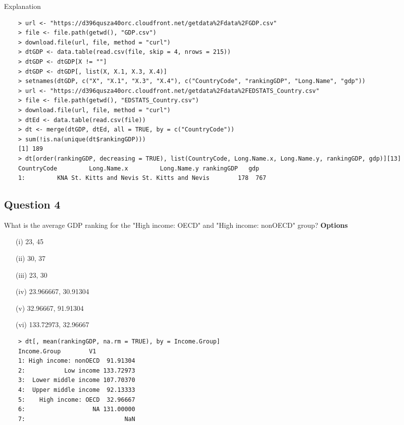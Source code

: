 \documentclass[]{article}
\begin{document}
Explanation
\begin{framed}
	\begin{verbatim}
	> url <- "https://d396qusza40orc.cloudfront.net/getdata%2Fdata%2FGDP.csv"
	> file <- file.path(getwd(), "GDP.csv")
	> download.file(url, file, method = "curl")
	> dtGDP <- data.table(read.csv(file, skip = 4, nrows = 215))
	> dtGDP <- dtGDP[X != ""]
	> dtGDP <- dtGDP[, list(X, X.1, X.3, X.4)]
	> setnames(dtGDP, c("X", "X.1", "X.3", "X.4"), c("CountryCode", "rankingGDP", "Long.Name", "gdp"))
	> url <- "https://d396qusza40orc.cloudfront.net/getdata%2Fdata%2FEDSTATS_Country.csv"
	> file <- file.path(getwd(), "EDSTATS_Country.csv")
	> download.file(url, file, method = "curl")
	> dtEd <- data.table(read.csv(file))
	> dt <- merge(dtGDP, dtEd, all = TRUE, by = c("CountryCode"))
	> sum(!is.na(unique(dt$rankingGDP)))
	[1] 189
	> dt[order(rankingGDP, decreasing = TRUE), list(CountryCode, Long.Name.x, Long.Name.y, rankingGDP, gdp)][13]
	CountryCode         Long.Name.x         Long.Name.y rankingGDP   gdp
	1:         KNA St. Kitts and Nevis St. Kitts and Nevis        178  767 
	\end{verbatim}
\end{framed}
\newpage
\subsection*{Question 4}
What is the average GDP ranking for the "High income: OECD" and "High income: nonOECD" group?
\textbf{Options}
\begin{itemize}
\item[(i)]  23, 45
\item[(ii)] 30, 37
\item[(iii)] 23, 30
\item[(iv)] 23.966667, 30.91304
\item[(v)] 32.96667, 91.91304
\item[(vi)] 133.72973, 32.96667
\end{itemize}


\begin{framed}
	\begin{verbatim}
	> dt[, mean(rankingGDP, na.rm = TRUE), by = Income.Group]
	Income.Group        V1
	1: High income: nonOECD  91.91304
	2:           Low income 133.72973
	3:  Lower middle income 107.70370
	4:  Upper middle income  92.13333
	5:    High income: OECD  32.96667
	6:                   NA 131.00000
	7:                            NaN
	\end{verbatim}
\end{framed}
\newpage
\end{document}
